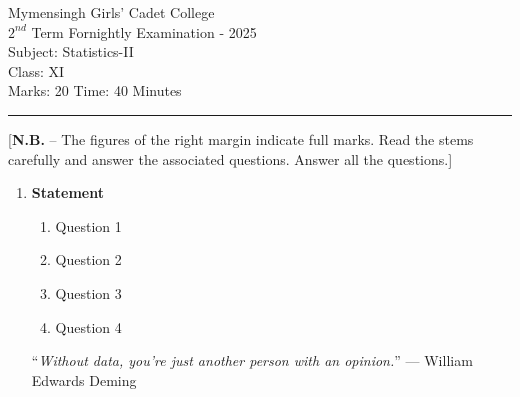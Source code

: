 \documentclass[12pt]{article}
\begin{document}
\begin{center}
Mymensingh Girls' Cadet College \\
$2^{nd}$ Term Fornightly Examination - 2025 \\
Subject: Statistics-II \\
Class: XI \\
Marks: 20 \hfill Time: 40 Minutes
\end{center}



\hrule


\begin{center}
[\textbf{N.B.} – The figures of the right margin indicate full marks. Read 
the stems carefully and answer the associated questions. Answer all the questions.]\\
\end{center}


  \begin{enumerate}

 \item
	  \textbf{Statement} 
  
  \begin{enumerate}
    \item
	Question \hfill 1
    \item
	Question \hfill 2
    \item  
	Question \hfill 3
    \item
	Question \hfill 4
  \end{enumerate}
  \vspace{3cm}
  
  \begin{center}
  
  “\textit{Without data, you’re just another person with an opinion.}” ---
  William Edwards Deming
  
  \end{center}

  
\end{enumerate}
\end{document}
